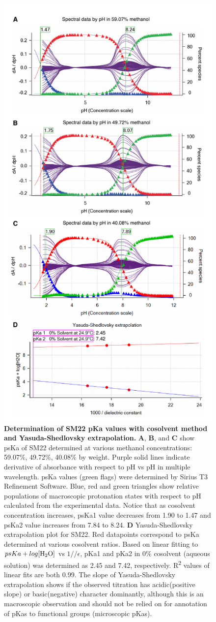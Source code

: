 \documentclass[9pt,lineno]{elife}
\begin{document}
\begin{figure}
\begin{center}
\includegraphics[width=0.5\linewidth]{figures/SM22_cosolvent_extrapolation_fig}
\caption{{\bf Determination of SM22 pKa values with cosolvent method and Yasuda-Shedlovsky extrapolation.} 
\textbf{A}, \textbf{B}, and \textbf{C} show psKa of SM22 determined at various methanol concentrations: 59.07\%, 49.72\%, 40.08\% by weight.  Purple solid lines indicate derivative of absorbance with respect to pH vs pH in multiple wavelength. psKa values (green flags) were determined by Sirius T3 Refinement Software. Blue, red and green triangles show relative populations of macroscopic protonation states with respect to pH calculated from the experimental data. Notice that as cosolvent concentration increases, psKa1 value decreases from 1.90 to 1.47 and psKa2 value increases from 7.84 to 8.24. \textbf{D} Yasuda-Shedlovsky extrapolation plot for SM22. Red datapoints correspond to psKa determined at various cosolvent ratios. Based on linear fitting to $psKa + log [\ce{H2O}]$ vs $1//\epsilon$, pKa1 and pKa2 in 0\% cosolvent (aqueous solution) was determined as 2.45 and 7.42, respectively. R\textsuperscript{2} values of linear fits are both 0.99. The slope of Yasuda-Shedlovsky extrapolation shows if the observed titration has acidic(positive slope) or basic(negative) character dominantly, although this is an macroscopic observation and should not be relied on for annotation of pKas to functional groups (microscopic pKas).
} 
\label{fig:YS_extrapolation}
\end{center}
\end{figure}
\end{document}
